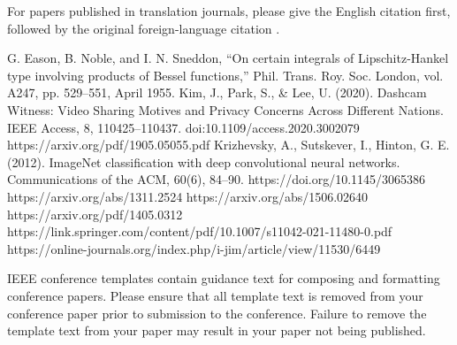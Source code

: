 \documentclass[conference]{IEEEtran}
\begin{document}
For papers published in translation journals, please give the English 
citation first, followed by the original foreign-language citation \cite{b6}.

\begin{thebibliography}{00}
 G. Eason, B. Noble, and I. N. Sneddon, ``On certain integrals of Lipschitz-Hankel type involving products of Bessel functions,'' Phil. Trans. Roy. Soc. London, vol. A247, pp. 529--551, April 1955.
 Kim, J., Park, S., \& Lee, U. (2020). Dashcam Witness: Video Sharing Motives and Privacy Concerns Across Different Nations. IEEE Access, 8, 110425–110437. doi:10.1109/access.2020.3002079 
 https://arxiv.org/pdf/1905.05055.pdf
 Krizhevsky, A., Sutskever, I., Hinton, G. E. (2012). ImageNet classification with deep convolutional neural networks. Communications of the ACM, 60(6), 84–90. https://doi.org/10.1145/3065386
 https://arxiv.org/abs/1311.2524
 https://arxiv.org/abs/1506.02640
 https://arxiv.org/pdf/1405.0312
 https://link.springer.com/content/pdf/10.1007/s11042-021-11480-0.pdf
 https://online-journals.org/index.php/i-jim/article/view/11530/6449
\end{thebibliography}
\vspace{12pt}
\color{red}
IEEE conference templates contain guidance text for composing and formatting conference papers. Please ensure that all template text is removed from your conference paper prior to submission to the conference. Failure to remove the template text from your paper may result in your paper not being published.
\end{document}

